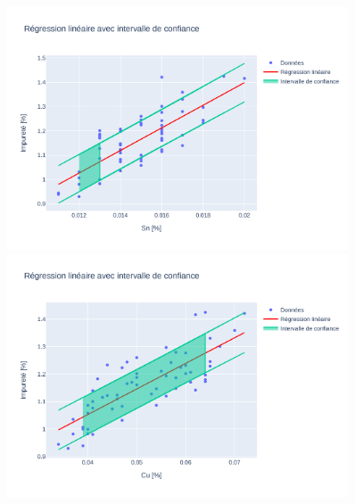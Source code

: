 \documentclass[12pt]{article}
\begin{document}
\begin{figure}[H]
    \centering
    \includegraphics[width=0.9\textwidth]{Images/Statistique/Regression_Impurete_Sn.pdf} %
    \vspace{10pt} %
    \includegraphics[width=0.9\textwidth]{Images/Statistique/Regression_Impurete_Cu.pdf}
\end{figure}
\end{document}
